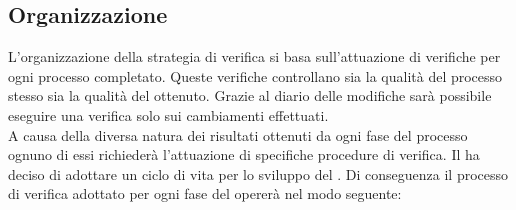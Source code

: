 	\subsection{Organizzazione}
		L'organizzazione della strategia di verifica si basa sull'attuazione di verifiche per ogni processo completato. Queste verifiche controllano sia la qualità del processo stesso sia la qualità del  ottenuto. Grazie al diario delle modifiche sarà possibile eseguire una verifica solo sui cambiamenti effettuati. \\
		A causa della diversa natura dei risultati ottenuti da ogni fase del processo ognuno di essi richiederà l'attuazione di specifiche procedure di verifica. Il  ha deciso di adottare un ciclo di vita  per lo sviluppo del . Di conseguenza il processo di verifica adottato per ogni fase del  opererà nel modo seguente:
